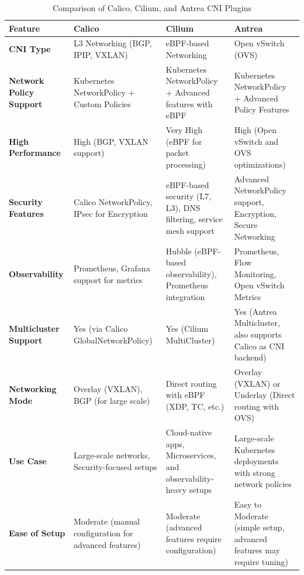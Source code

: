 \begin{table}[h!]
\centering
\begin{tabular}{|l|l|l|l|}
\hline
\textbf{Feature}                  & \textbf{Calico}                                                   & \textbf{Cilium}                                                   & \textbf{Antrea}                                                   \\ \hline
\textbf{CNI Type}                  & L3 Networking (BGP, IPIP, VXLAN)                                  & eBPF-based Networking                                              & Open vSwitch (OVS)                                               \\ \hline
\textbf{Network Policy Support}    & Kubernetes NetworkPolicy + Custom Policies                        & Kubernetes NetworkPolicy + Advanced features with eBPF            & Kubernetes NetworkPolicy + Advanced Policy Features               \\ \hline
\textbf{High Performance}          & High (BGP, VXLAN support)                                         & Very High (eBPF for packet processing)                             & High (Open vSwitch and OVS optimizations)                         \\ \hline
\textbf{Security Features}         & Calico NetworkPolicy, IPsec for Encryption                        & eBPF-based security (L7, L3), DNS filtering, service mesh support & Advanced NetworkPolicy support, Encryption, Secure Networking    \\ \hline
\textbf{Observability}             & Prometheus, Grafana support for metrics                           & Hubble (eBPF-based observability), Prometheus integration          & Prometheus, Flow Monitoring, Open vSwitch Metrics                 \\ \hline
\textbf{Multicluster Support}      & Yes (via Calico GlobalNetworkPolicy)                              & Yes (Cilium MultiCluster)                                          & Yes (Antrea Multicluster, also supports Calico as CNI backend)    \\ \hline
\textbf{Networking Mode}           & Overlay (VXLAN), BGP (for large scale)                            & Direct routing with eBPF (XDP, TC, etc.)                           & Overlay (VXLAN) or Underlay (Direct routing with OVS)             \\ \hline
\textbf{Use Case}                  & Large-scale networks, Security-focused setups                     & Cloud-native apps, Microservices, and observability-heavy setups   & Large-scale Kubernetes deployments with strong network policies  \\ \hline
\textbf{Ease of Setup}             & Moderate (manual configuration for advanced features)            & Moderate (advanced features require configuration)                 & Easy to Moderate (simple setup, advanced features may require tuning) \\ \hline
\end{tabular}
\caption{Comparison of Calico, Cilium, and Antrea CNI Plugins}
\label{tab:cni-comparison}
\end{table}


